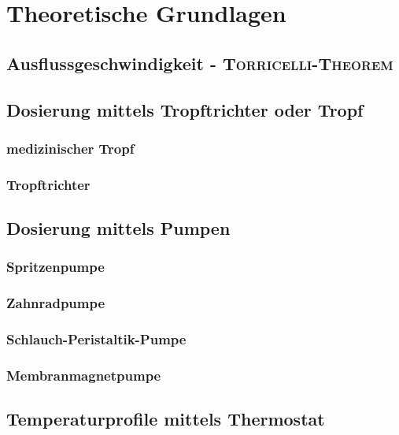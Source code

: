 \section{Theoretische Grundlagen}
\label{sec:physik}

\subsection{Ausflussgeschwindigkeit - \textsc{Torricelli-Theorem}}

\subsection{Dosierung mittels Tropftrichter oder Tropf}
\subsubsection*{medizinischer Tropf}
\subsubsection*{Tropftrichter}

\subsection{Dosierung mittels Pumpen}
\subsubsection*{Spritzenpumpe}
\subsubsection*{Zahnradpumpe}
\subsubsection*{Schlauch-Peristaltik-Pumpe}
\subsubsection*{Membranmagnetpumpe}



\subsection{Temperaturprofile mittels Thermostat}
